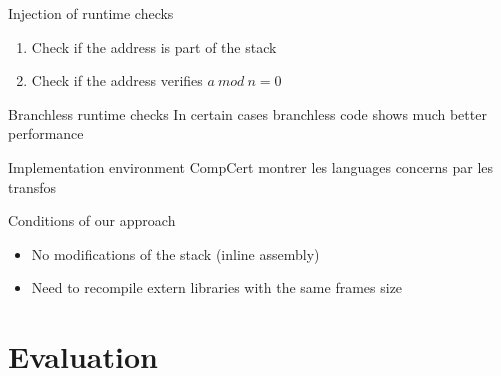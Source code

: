 \documentclass{beamer}
\begin{document}
\begin{frame}[fragile]{Injection of runtime checks}
	\begin{enumerate}
		\item Check if the address is part of the stack
		\item Check if the address verifies $a~mod~n=0$
	\end{enumerate}
	\hfill \break
	\Check
\end{frame}

\begin{frame}{Branchless runtime checks}
	In certain cases  branchless code shows much better performance
	\Branchless
\end{frame}


\begin{frame}[c]{Implementation environment}
	CompCert
	montrer les languages concerns par les transfos
\end{frame}

\begin{frame}[c]{Conditions of our approach}
	\begin{itemize}
		\item No modifications of the stack (inline assembly)
			\Inline
		\item Need to recompile extern libraries with the same frames size
	\end{itemize}
\end{frame}

\section{Evaluation}
\label{sec:Implementation}
\end{document}
